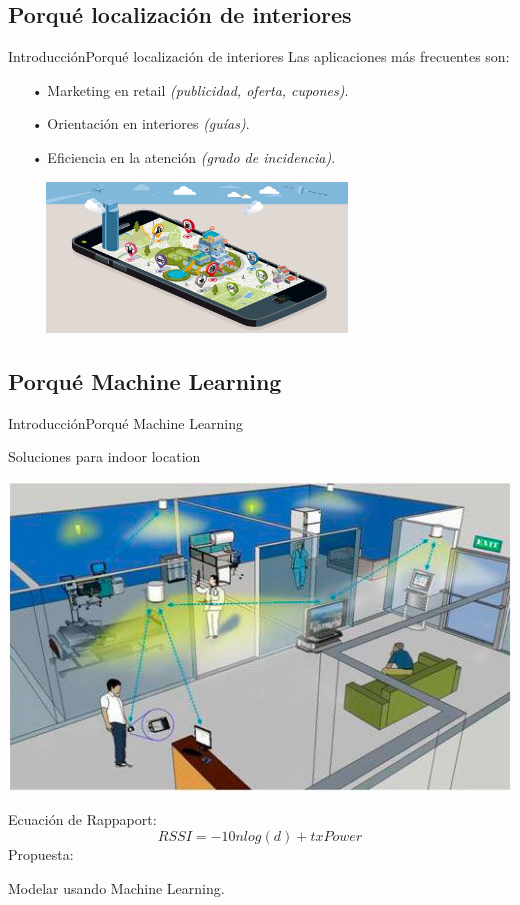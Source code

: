 \documentclass[10pt]{beamer}
\begin{document}
\subsection{Porqué localización de interiores}
\begin{frame}{Introducción}{Porqué localización de interiores}
Las aplicaciones más frecuentes son:
\begin{itemize}
	\item[•] Marketing en retail \textit{(publicidad, oferta, cupones)}.
	\item[•] Orientación en interiores \textit{(guías)}.
	\item[•] Eficiencia en la atención \textit{(grado de incidencia)}.
\end{itemize}
\includegraphics[width=10cm,height=4cm]{AAUgraphics/indoor}
\end{frame}
\subsection{Porqué Machine Learning}
\begin{frame}{Introducción}{Porqué Machine Learning}
\begin{block}{Soluciones para indoor location}
\begin{center}
\includegraphics[scale=0.3]{AAUgraphics/ips}
\end{center}
Ecuación de Rappaport:
$$RSSI = -10 n log(d) + txPower$$
Propuesta:\\
\begin{center}
Modelar usando Machine Learning.
\end{center}
\end{block}
\end{frame}
\end{document}
